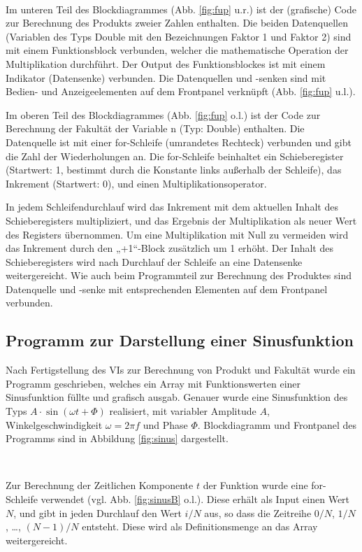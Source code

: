 \

Im unteren Teil des Blockdiagrammes (Abb. \ref{fig:fup} u.r.) ist der (grafische) Code zur Berechnung des Produkts zweier Zahlen enthalten. Die beiden Datenquellen (Variablen des Typs Double mit den Bezeichnungen Faktor 1 und Faktor 2) sind mit einem Funktionsblock verbunden, welcher die mathematische Operation der Multiplikation durchführt. Der Output des Funktionsblockes ist mit einem Indikator (Datensenke) verbunden. Die Datenquellen und -senken sind mit Bedien- und Anzeigeelementen auf dem Frontpanel verknüpft (Abb. \ref{fig:fup} u.l.).

Im oberen Teil des Blockdiagrammes (Abb. \ref{fig:fup} o.l.) ist der Code zur Berechnung der Fakultät der Variable n (Typ: Double) enthalten. Die Datenquelle ist mit einer for-Schleife (umrandetes Rechteck) verbunden und gibt die Zahl der Wiederholungen an. Die for-Schleife beinhaltet ein Schieberegister (Startwert: 1, bestimmt durch die Konstante links außerhalb der Schleife), das Inkrement (Startwert: 0), und einen Multiplikationsoperator.

In jedem Schleifendurchlauf wird das Inkrement mit dem aktuellen Inhalt des Schieberegisters multipliziert, und das Ergebnis der Multiplikation als neuer Wert des Registers übernommen. Um eine Multiplikation mit Null zu vermeiden wird das Inkrement durch den „+1“-Block zusätzlich um 1 erhöht. Der Inhalt des Schieberegisters wird nach Durchlauf der Schleife an eine Datensenke weitergereicht. Wie auch beim Programmteil zur Berechnung des Produktes sind Datenquelle und -senke mit entsprechenden Elementen auf dem Frontpanel verbunden.

\subsection{Programm zur Darstellung einer Sinusfunktion}

Nach Fertigstellung des VIs zur Berechnung von Produkt und Fakultät wurde ein Programm geschrieben, welches ein Array mit Funktionswerten einer Sinusfunktion füllte und grafisch ausgab. Genauer wurde eine Sinusfunktion des Typs $A\cdot \sin( \omega t + \Phi)$ realisiert, mit variabler Amplitude $A$, Winkelgeschwindigkeit $ \omega=2 \pi f$ und Phase $\Phi$. Blockdiagramm und Frontpanel des Programms sind in Abbildung \ref{fig:sinus} dargestellt.

\

Zur Berechnung der Zeitlichen Komponente $t$ der Funktion wurde eine for-Schleife verwendet (vgl. Abb. \ref{fig:sinusB} o.l.). Diese erhält als Input einen Wert $N$, und gibt in jeden Durchlauf den Wert $i/N$ aus, so dass die Zeitreihe $0/N$, $1/N$, …, $(N-1)/N$ entsteht. Diese wird als Definitionsmenge an das Array weitergereicht.

